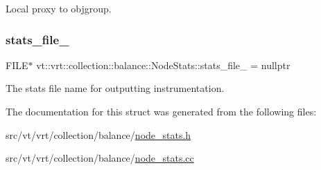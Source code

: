 Local proxy to objgroup. 

\mbox{\label{structvt_1_1vrt_1_1collection_1_1balance_1_1_node_stats_a8f2c59c675643634d8e4d2d5ba89ecbd}} 
\subsubsection{\texorpdfstring{stats\+\_\+file\+\_\+}{stats\_file\_}}
{\footnotesize\ttfamily F\+I\+LE$\ast$ vt\+::vrt\+::collection\+::balance\+::\+Node\+Stats\+::stats\+\_\+file\+\_\+ = nullptr\hspace{0.3cm}{\ttfamily [private]}}



The stats file name for outputting instrumentation. 



The documentation for this struct was generated from the following files\+:\begin{DoxyCompactItemize}
\item 
src/vt/vrt/collection/balance/\hyperlink{node__stats_8h}{node\+\_\+stats.\+h}\item 
src/vt/vrt/collection/balance/\hyperlink{node__stats_8cc}{node\+\_\+stats.\+cc}\end{DoxyCompactItemize}
